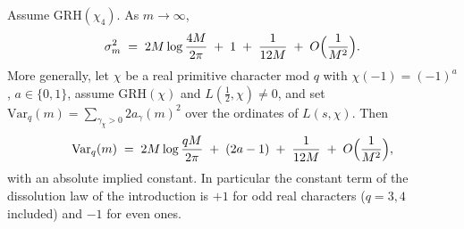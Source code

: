 \begin{proposition}\label{prop:varasymp}
Assume GRH$(\chi_4)$. As $m\to\infty$,
\begin{equation}\label{eq:varasymp4}
\sigma_m^2\;=\;2M\log\frac{4M}{2\pi}\;+\;1\;+\;\frac{1}{12M}
\;+\;O\Bigl(\frac{1}{M^2}\Bigr).
\end{equation}
More generally, let $\chi$ be a real primitive character mod $q$ with
$\chi(-1)=(-1)^a$, $a\in\{0,1\}$, assume GRH$(\chi)$ and
$L(\tfrac12,\chi)\ne0$, and set
$\mathrm{Var}_q(m)=\sum_{\gamma_\chi>0}2a_{\gamma}(m)^2$ over the
ordinates of $L(s,\chi)$. Then
\begin{equation}\label{eq:varasympq}
\mathrm{Var}_q(m)\;=\;2M\log\frac{qM}{2\pi}\;+\;(2a-1)
\;+\;\frac{1}{12M}\;+\;O\Bigl(\frac{1}{M^2}\Bigr),
\end{equation}
with an absolute implied constant. In particular the constant term of
the dissolution law of the introduction is $+1$ for odd real
characters ($q=3,4$ included) and $-1$ for even ones.
\end{proposition}

